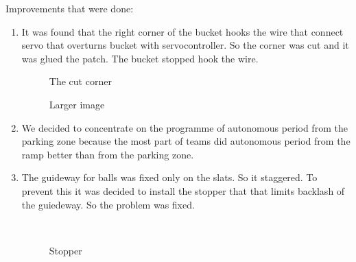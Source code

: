 Improvements that were done:
\begin{enumerate}
	\item It was found that the right corner of the bucket hooks the wire that connect servo that overturns bucket with servocontroller. So the corner was cut and it was glued the patch. The bucket stopped hook the wire.
	\begin{figure}[H]
		\begin{minipage}[h]{0.47\linewidth}
			\caption{The cut corner}
		\end{minipage}
		\hfill
		\begin{minipage}[h]{0.47\linewidth}
			\caption{Larger image}
		\end{minipage}
	\end{figure}
	
	\item We decided to concentrate on the programme of autonomous period from the parking zone because the most part of teams did autonomous period from the ramp better than from the parking zone.
	
		\item The guideway for balls was fixed only on the slats. So it staggered. To prevent this it was decided to install the stopper that that limits backlash of the guiedeway. So the problem was fixed.
	\begin{figure}[H]
		\begin{minipage}[h]{0.2\linewidth}
			\center  
		\end{minipage}
		\begin{minipage}[h]{0.6\linewidth}
			\caption{Stopper}
		\end{minipage}
	\end{figure}
	
\end{enumerate}
\fillpage
